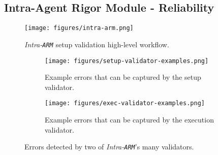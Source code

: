 
\subsection{Intra-Agent Rigor Module - Reliability}
\label{subsec:intra-agent-primitive}

\begin{figure}
    \centering
    \texttt{[image: figures/intra-arm.png]}
    \caption{\textit{Intra-\texttt{ARM}} setup validation high-level workflow.}
    \label{fig:intra-arm}
\end{figure}



 


\begin{figure}[t!] %
\centering
\begin{subfigure}{0.5\textwidth}
\centering
\texttt{[image: figures/setup-validator-examples.png]}
\caption{Example errors that can be captured by the setup validator. 
}
\label{fig:setup-validator-examples}
\end{subfigure} 
\hfill
\begin{subfigure}{0.5\textwidth}
\centering
\texttt{[image: figures/exec-validator-examples.png]}
\caption{Example errors that can be captured by the execution validator.
}
\label{fig:exec-validator-examples}
\end{subfigure}
\caption{Errors detected by two of \textit{Intra-\texttt{ARM}}'s many validators.
}
\vspace{-3mm}
\label{fig:intra-arm-error-examples}
\end{figure}

 

